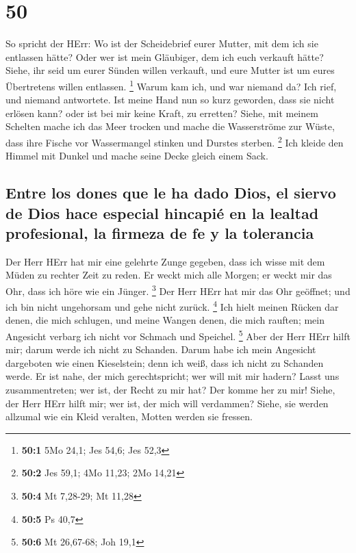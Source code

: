\hypertarget{section-49}{%
\section{50}\label{section-49}}

 So spricht der HErr: Wo ist der Scheidebrief eurer
Mutter, mit dem ich sie entlassen hätte? Oder wer ist mein Gläubiger,
dem ich euch verkauft hätte? Siehe, ihr seid um eurer Sünden willen
verkauft, und eure Mutter ist um eures Übertretens willen entlassen.
\footnote{\textbf{50:1} 5Mo 24,1; Jes 54,6; Jes 52,3} 
Warum kam ich, und war niemand da? Ich rief, und niemand antwortete. Ist
meine Hand nun so kurz geworden, dass sie nicht erlösen kann? oder ist
bei mir keine Kraft, zu erretten? Siehe, mit meinem Schelten mache ich
das Meer trocken und mache die Wasserströme zur Wüste, dass ihre Fische
vor Wassermangel stinken und Durstes sterben. \footnote{\textbf{50:2}
  Jes 59,1; 4Mo 11,23; 2Mo 14,21}  Ich kleide den Himmel
mit Dunkel und mache seine Decke gleich einem Sack.

\hypertarget{entre-los-dones-que-le-ha-dado-dios-el-siervo-de-dios-hace-especial-hincapiuxe9-en-la-lealtad-profesional-la-firmeza-de-fe-y-la-tolerancia}{%
\subsection{Entre los dones que le ha dado Dios, el siervo de Dios hace
especial hincapié en la lealtad profesional, la firmeza de fe y la
tolerancia}\label{entre-los-dones-que-le-ha-dado-dios-el-siervo-de-dios-hace-especial-hincapiuxe9-en-la-lealtad-profesional-la-firmeza-de-fe-y-la-tolerancia}}

 Der Herr HErr hat mir eine gelehrte Zunge gegeben, dass
ich wisse mit dem Müden zu rechter Zeit zu reden. Er weckt mich alle
Morgen; er weckt mir das Ohr, dass ich höre wie ein Jünger. \footnote{\textbf{50:4}
  Mt 7,28-29; Mt 11,28}  Der Herr HErr hat mir das Ohr
geöffnet; und ich bin nicht ungehorsam und gehe nicht zurück.
\footnote{\textbf{50:5} Ps 40,7}  Ich hielt meinen Rücken
dar denen, die mich schlugen, und meine Wangen denen, die mich rauften;
mein Angesicht verbarg ich nicht vor Schmach und Speichel. \footnote{\textbf{50:6}
  Mt 26,67-68; Joh 19,1}  Aber der Herr HErr hilft mir;
darum werde ich nicht zu Schanden. Darum habe ich mein Angesicht
dargeboten wie einen Kieselstein; denn ich weiß, dass ich nicht zu
Schanden werde.  Er ist nahe, der mich gerechtspricht; wer
will mit mir hadern? Lasst uns zusammentreten; wer ist, der Recht zu mir
hat? Der komme her zu mir!  Siehe, der Herr HErr hilft
mir; wer ist, der mich will verdammen? Siehe, sie werden allzumal wie
ein Kleid veralten, Motten werden sie fressen.

